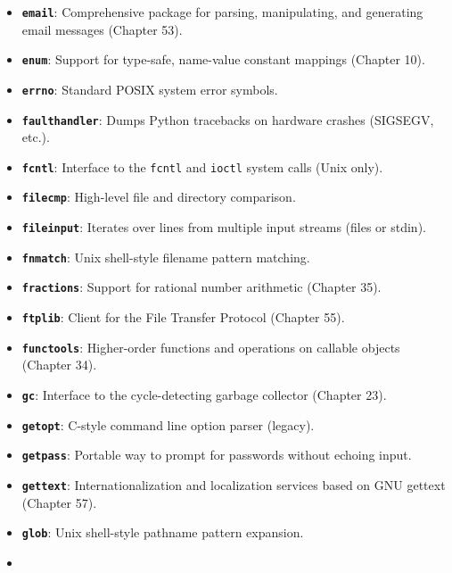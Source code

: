 \begin{itemize}
\tightlist
\item
  \textbf{\passthrough{\lstinline!email!}}: Comprehensive package for
  parsing, manipulating, and generating email messages (Chapter 53).
\item
  \textbf{\passthrough{\lstinline!enum!}}: Support for type-safe,
  name-value constant mappings (Chapter 10).
\item
  \textbf{\passthrough{\lstinline!errno!}}: Standard POSIX system error
  symbols.
\item
  \textbf{\passthrough{\lstinline!faulthandler!}}: Dumps Python
  tracebacks on hardware crashes (SIGSEGV, etc.).
\item
  \textbf{\passthrough{\lstinline!fcntl!}}: Interface to the
  \passthrough{\lstinline!fcntl!} and \passthrough{\lstinline!ioctl!}
  system calls (Unix only).
\item
  \textbf{\passthrough{\lstinline!filecmp!}}: High-level file and
  directory comparison.
\item
  \textbf{\passthrough{\lstinline!fileinput!}}: Iterates over lines from
  multiple input streams (files or stdin).
\item
  \textbf{\passthrough{\lstinline!fnmatch!}}: Unix shell-style filename
  pattern matching.
\item
  \textbf{\passthrough{\lstinline!fractions!}}: Support for rational
  number arithmetic (Chapter 35).
\item
  \textbf{\passthrough{\lstinline!ftplib!}}: Client for the File
  Transfer Protocol (Chapter 55).
\item
  \textbf{\passthrough{\lstinline!functools!}}: Higher-order functions
  and operations on callable objects (Chapter 34).
\item
  \textbf{\passthrough{\lstinline!gc!}}: Interface to the
  cycle-detecting garbage collector (Chapter 23).
\item
  \textbf{\passthrough{\lstinline!getopt!}}: C-style command line option
  parser (legacy).
\item
  \textbf{\passthrough{\lstinline!getpass!}}: Portable way to prompt for
  passwords without echoing input.
\item
  \textbf{\passthrough{\lstinline!gettext!}}: Internationalization and
  localization services based on GNU gettext (Chapter 57).
\item
  \textbf{\passthrough{\lstinline!glob!}}: Unix shell-style pathname
  pattern expansion.
\item

\end{itemize}
